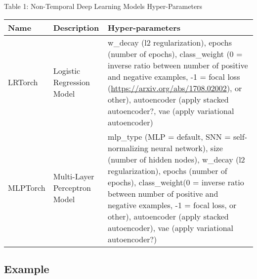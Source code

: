 \documentclass[]{article}
\begin{document}
Table 1: Non-Temporal Deep Learning Models Hyper-Parameters

\begin{longtable}[]{@{}lll@{}}
\toprule
\begin{minipage}[b]{0.11\columnwidth}\raggedright\strut
Name\strut
\end{minipage} & \begin{minipage}[b]{0.34\columnwidth}\raggedright\strut
Description\strut
\end{minipage} & \begin{minipage}[b]{0.46\columnwidth}\raggedright\strut
Hyper-parameters\strut
\end{minipage}\tabularnewline
\midrule
\endhead
\begin{minipage}[t]{0.11\columnwidth}\raggedright\strut
LRTorch\strut
\end{minipage} & \begin{minipage}[t]{0.34\columnwidth}\raggedright\strut
Logistic Regression Model\strut
\end{minipage} & \begin{minipage}[t]{0.46\columnwidth}\raggedright\strut
w\_decay (l2 regularization), epochs (number of epochs), class\_weight
(0 = inverse ratio between number of positive and negative examples, -1
= focal loss (\url{https://arxiv.org/abs/1708.02002}), or other),
autoencoder (apply stacked autoencoder?, vae (apply variational
autoencoder)\strut
\end{minipage}\tabularnewline
\begin{minipage}[t]{0.11\columnwidth}\raggedright\strut
MLPTorch\strut
\end{minipage} & \begin{minipage}[t]{0.34\columnwidth}\raggedright\strut
Multi-Layer Perceptron Model\strut
\end{minipage} & \begin{minipage}[t]{0.46\columnwidth}\raggedright\strut
mlp\_type (MLP = default, SNN = self-normalizing neural network), size
(number of hidden nodes), w\_decay (l2 regularization), epochs (number
of epochs), class\_weight(0 = inverse ratio between number of positive
and negative examples, -1 = focal loss, or other), autoencoder (apply
stacked autoencoder), vae (apply variational autoencoder?)\strut
\end{minipage}\tabularnewline
\bottomrule
\end{longtable}

\subsection{Example}\label{example}
\end{document}

